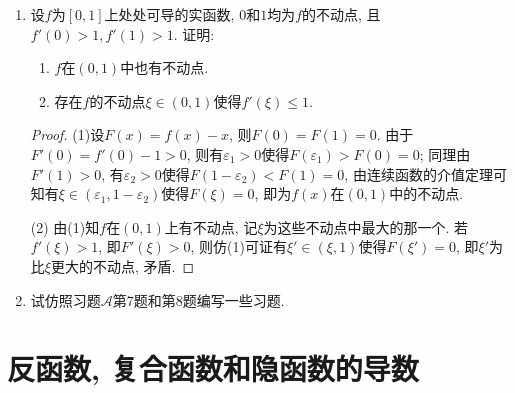 \begin{1b}
\begin{enumerate}
\begin{proof}[解答]
    另一方面，如果前面给出的条件成立，那么
    \begin{align*}
        \Delta P+\ii\Delta Q&=(P_x+\ii Q_x)\Delta x+(P_y+\ii Q_y)\Delta y+o(\Delta x+i\Delta y)\\
        &=(P_x+\ii Q_x)\Delta x+(-Q_x+\ii P_x)\Delta y+o(\Delta x+\ii\Delta y)\\
        &=(P_x+\ii Q_x)(\Delta x+\ii\Delta y)+o(\Delta x+\ii\Delta y),
    \end{align*}
    这说明极限存在，等于$P_x+\ii Q_x$。
\end{proof}
\item 设\(f\)为\([0,1]\)上处处可导的实函数, \(0\)和\(1\)均为\(f\)的不动点, 且\(f'(0)>1,f'(1)>1\). 证明:
\begin{enumerate}[label=(\arabic*)]
\item \(f\)在\((0,1)\)中也有不动点.
\item 存在\(f\)的不动点\(\xi\in(0,1)\)使得\(f'(\xi)\leqslant 1\).
\end{enumerate}
\begin{proof}
(1)设\(F(x)=f(x)-x\), 则\(F(0)=F(1)=0\). 由于\(F'(0)=f'(0)-1>0\), 
则有\(\varepsilon_1>0\)使得\(F(\varepsilon_1)>F(0)=0\); 
同理由\(F'(1)>0\), 有\(\varepsilon_2>0\)使得\(F(1-\varepsilon_2)<F(1)=0\), 
由连续函数的介值定理可知有\(\xi\in(\varepsilon_1,1-\varepsilon_2)\)使得\(F(\xi)=0\), 
即为\(f(x)\)在\((0,1)\)中的不动点.

(2) 由(1)知\(f\)在\((0,1)\)上有不动点, 记\(\xi\)为这些不动点中最大的那一个. 
若\(f'(\xi)>1\), 即\(F'(\xi)>0\), 则仿(1)可证有\(\xi'\in(\xi,1)\)使得\(F(\xi')=0\), 即\(\xi'\)为比\(\xi\)更大的不动点, 矛盾.
\end{proof}
\item 试仿照习题\(\boldsymbol{\mathcal{A}}\)第7题和第8题编写一些习题.
\end{enumerate}
\end{1b}

\section{反函数, 复合函数和隐函数的导数}

